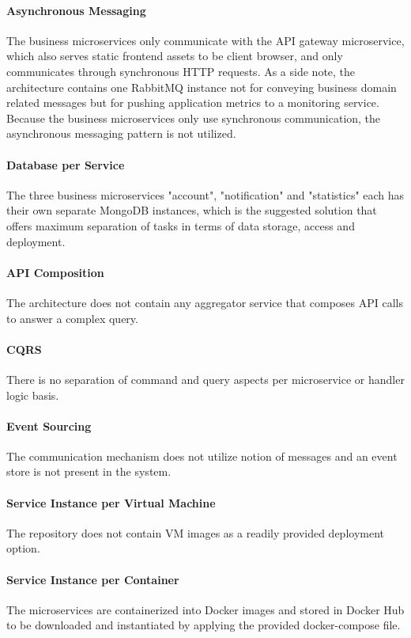 \documentclass{Configuration_Files/PoliMi3i_thesis}
\begin{document}
    \paragraph{Asynchronous Messaging} The business microservices only communicate with the API gateway microservice, which also serves static frontend assets to be client browser, and only communicates through synchronous HTTP requests.
    As a side note, the architecture contains one RabbitMQ instance not for conveying business domain related messages but for pushing application metrics to a monitoring service.
    Because the business microservices only use synchronous communication, the asynchronous messaging pattern is not utilized.
    
    \paragraph{Database per Service} The three business microservices "account", "notification" and "statistics" each has their own separate MongoDB instances, which is the suggested solution that offers maximum separation of tasks in terms of data storage, access and deployment.
    
    \paragraph{API Composition} The architecture does not contain any aggregator service that composes API calls to answer a complex query.
    
    \paragraph{CQRS} There is no separation of command and query aspects per microservice or handler logic basis.
    
    \paragraph{Event Sourcing} The communication mechanism does not utilize notion of messages and an event store is not present in the system.
    
    \paragraph{Service Instance per Virtual Machine} The repository does not contain VM images as a readily provided deployment option.
    
    \paragraph{Service Instance per Container} The microservices are containerized into Docker images and stored in Docker Hub to be downloaded and instantiated by applying the provided docker-compose file.
    
\end{document}
